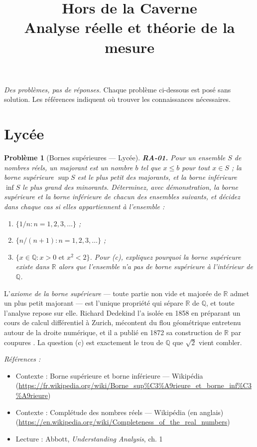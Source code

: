 \documentclass[11pt]{article}
\title{Hors de la Caverne \\ \Large Analyse réelle et théorie de la mesure}
\author{}
\date{}
\newtheorem{problem}{Problème}
\newenvironment{refs}{\par\small\noindent\emph{Références :}\begin{itemize}\setlength\itemsep{0pt}}{\end{itemize}\normalsize}
\begin{document}
\maketitle
\noindent\emph{Des problèmes, pas de réponses.} Chaque problème ci-dessous est posé
sans solution. Les références indiquent où trouver les connaissances nécessaires.
\medskip


\section*{Lycée}

\begin{problem}[{Bornes supérieures --- Lycée}]
\textbf{RA-01.} Pour un ensemble $ S $ de nombres réels, un \textit{majorant}
est un nombre $ b $ tel que $ x \le b $ pour tout $ x \in S $ ; la \textit{borne supérieure}
$ \sup S $ est le plus petit des majorants, et la \textit{borne inférieure} $ \inf S $ le plus
grand des minorants. Déterminez, avec démonstration, la borne supérieure et la borne inférieure de
chacun des ensembles suivants, et décidez dans chaque cas si elles appartiennent à l'ensemble :
\begin{enumerate}
\item[(a)] $ \{ 1/n : n = 1, 2, 3, \dots \} $ ;
\item[(b)] $ \{ n/(n+1) : n = 1, 2, 3, \dots \} $ ;
\item[(c)] $ \{ x \in \mathbb{Q} : x > 0 \text{ et } x^2 < 2 \} $.
Pour (c), expliquez pourquoi la borne supérieure existe dans $ \mathbb{R} $ alors que l'ensemble
n'a pas de borne supérieure à l'intérieur de $ \mathbb{Q} $.
\end{enumerate}

\end{problem}

\noindent L'\textit{axiome de la borne supérieure} --- toute partie non vide et majorée de $\mathbb{R}$
admet un plus petit majorant --- est l'unique propriété qui sépare $\mathbb{R}$ de $\mathbb{Q}$, et toute l'analyse repose
sur elle. Richard Dedekind l'a isolée en 1858 en préparant un cours de calcul différentiel à
Zurich, mécontent du flou géométrique entretenu autour de la droite numérique, et il a publié en
1872 sa construction de $\mathbb{R}$ par \og{} coupures \fg{}. La question (c) est exactement le trou de $\mathbb{Q}$ que
$ \sqrt{2} $ vient combler.

\begin{refs}
\item Contexte : Borne supérieure et borne inférieure --- Wikipédia (\url{https://fr.wikipedia.org/wiki/Borne_sup%C3%A9rieure_et_borne_inf%C3%A9rieure})
\item Contexte : Complétude des nombres réels --- Wikipédia (en anglais) (\url{https://en.wikipedia.org/wiki/Completeness_of_the_real_numbers})
\item Lecture : Abbott, \textit{Understanding Analysis}, ch. 1
\end{refs}
\end{document}

